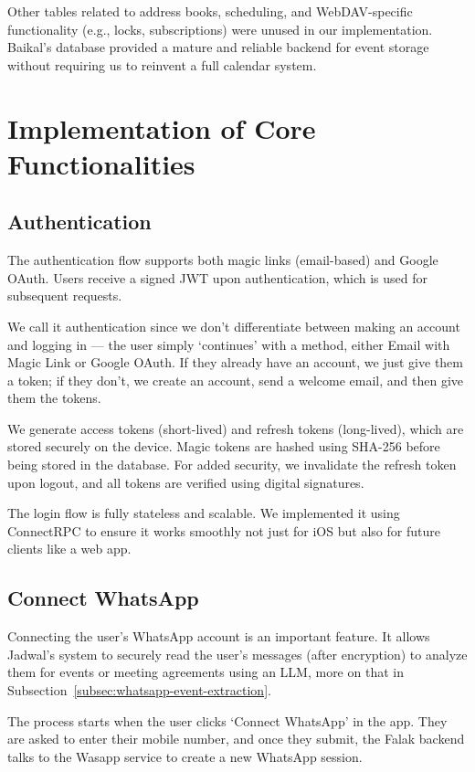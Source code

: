 Other tables related to address books, scheduling, and WebDAV-specific functionality (e.g., locks, subscriptions) were unused in our implementation. Baikal's database provided a mature and reliable backend for event storage without requiring us to reinvent a full calendar system.


\section{Implementation of Core Functionalities}

\subsection{Authentication} \label{subsec:authentication}

The authentication flow supports both magic links (email-based) and Google OAuth. Users receive a signed JWT upon authentication, which is used for subsequent requests.

We call it authentication since we don't differentiate between making an account and logging in — the user simply `continues' with a method, either Email with Magic Link or Google OAuth. If they already have an account, we just give them a token; if they don't, we create an account, send a welcome email, and then give them the tokens.

We generate access tokens (short-lived) and refresh tokens (long-lived), which are stored securely on the device. Magic tokens are hashed using SHA-256 before being stored in the database. For added security, we invalidate the refresh token upon logout, and all tokens are verified using digital signatures.

The login flow is fully stateless and scalable. We implemented it using ConnectRPC to ensure it works smoothly not just for iOS but also for future clients like a web app.

\subsection{Connect WhatsApp}

Connecting the user's WhatsApp account is an important feature. It allows Jadwal's system to securely read the user's messages (after encryption) to analyze them for events or meeting agreements using an LLM, more on that in Subsection~\ref{subsec:whatsapp-event-extraction}.

The process starts when the user clicks `Connect WhatsApp' in the app. They are asked to enter their mobile number, and once they submit, the Falak backend talks to the Wasapp service to create a new WhatsApp session.

